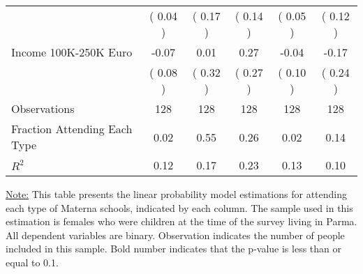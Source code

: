 \begin{table}[H]
{\begin{tabular}{lccccc}
\quad  & (     0.04 ) & (     0.17 )  & (     0.14 )  & (     0.05 ) & (     0.12 ) \\
\quad Income 100K-250K Euro &     -0.07 &      0.01 &      0.27 &     -0.04 &     -0.17 \\
\quad  & (     0.08 ) & (     0.32 )  & (     0.27 )  & (     0.10 ) & (     0.24 ) \\
\midrule
Observations & 128 & 128 & 128 & 128 & 128 \\
Fraction Attending Each Type &      0.02 &      0.55 &      0.26 &      0.02 &      0.14 \\
\midrule
$ R^2$ &      0.12 &      0.17 &      0.23 &      0.13 &      0.10 \\
\bottomrule
\end{tabular}}
\end{table}
\begin{footnotesize}
\noindent\underline{Note:} This table presents the linear probability model estimations for attending each type of Materna schools, indicated by each column. The sample used in this estimation is females who were children at the time of the survey living in Parma. All dependent variables are binary. Observation indicates the number of people included in this sample. Bold number indicates that the p-value is less than or equal to 0.1.
\end{footnotesize}

